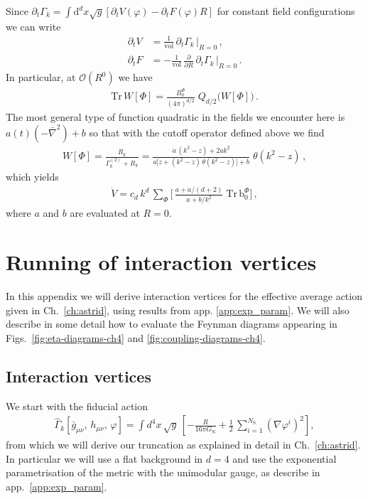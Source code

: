\documentclass[11pt]{book}
\newcommand\bgmunu{ \bar g_{\mu\nu} }
\newcommand\hmunu{ h_{\mu\nu} }
\newcommand\NS{ N_{\scriptscriptstyle{\mathrm{S}}} }
\newcommand\GNewton{ G_{\scriptscriptstyle{\mathrm{N}}}{} }
\newcommand{\Tr}{\mathrm{Tr}}
\numberwithin{equation}{chapter}
\begin{document}
\begin{appendices}
Since $\partial_t \Gamma_k = \int \mathrm{d}^d x \sqrt{g} \left[ \partial_t V(\varphi) - \partial_t F(\varphi) R\right]$
for constant field configurations we can write
\begin{align}
  \partial_t V &=   \frac{1}{\mathrm{vol}} \, \partial_t \Gamma_k                                 \, \bigg|_{R=0} \,, \\
  \partial_t F &= - \frac{1}{\mathrm{vol}} \, \frac{\partial}{\partial R} \, \partial_t \Gamma_k  \, \bigg|_{R=0} \,.
\end{align}
In particular, at $\mathcal{O}(R^0)$ we have
\begin{align}
  \Tr \, W[\Phi] = \frac{B_0^{\Phi}}{(4\pi)^{d/2}} \; Q_{d/2} \Big( W[\Phi] \Big) \,.
\end{align}
The most general type of function quadratic in the fields we encounter here is
$a(t)(-\bar{\nabla}^2)+b$ so that with the cutoff operator defined above
we find
\begin{align}
  W[\Phi] = \frac{ \dot R_k }{ \Gamma_k^{(2)} + R_k }
  = \frac{ \dot a  \, (k^2-z) + 2ak^2 }{ a \big[ z+(k^2-z) \, \theta(k^2-z) \big] + b } \; \theta(k^2-z) \,,
\end{align}
which yields
\begin{align}
  \dot V = c_d \, k^d \, \sum_{\Phi} \bigg[  \, \frac{a+\dot{a}/(d+2)}{a+b/k^2} \; \Tr \, \mathrm b_0^\Phi \bigg] \,,
\end{align}
where $a$ and $b$ are evaluated at $R=0$.


\chapter{Running of interaction vertices}
\label{app:EH}

In this appendix we will derive interaction vertices
for the effective average action given in Ch.~\ref{ch:astrid},
using results from app. \ref{app:exp_param}. We will also
describe in some detail how to evaluate the Feynman
diagrams appearing
in Figs.~\ref{fig:eta-diagrams-ch4}
and \ref{fig:coupling-diagrams-ch4}.

\section{Interaction vertices}

We start with the fiducial action
\begin{align}
  \hat \Gamma_k[\bgmunu, \, \hmunu, \, \varphi] = \int d^4x \, \sqrt{g} \,
  \left[
    - \frac{R}{16 \pi \GNewton} + \frac{1}{2} \, \sum_{i=1}^{\NS} \left( \nabla\varphi^i \right)^2
  \right] ,
\end{align}
from which we will derive our truncation as explained in detail in Ch.~\ref{ch:astrid}.
In particular we will use a flat background in $d=4$ and use the
exponential parametrisation of the metric with the unimodular gauge, as
describe in app.~\ref{app:exp_param}.


\end{appendices}
\end{document}
